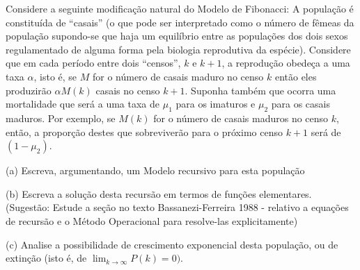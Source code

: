 
    \begin{exercise}
    Considere a seguinte modificação natural do Modelo de Fibonacci: A população é constituída de ``casais'' (o que pode ser interpretado como o número de fêmeas da população supondo-se que haja um equilíbrio entre as populações dos dois sexos regulamentado de alguma forma pela biologia reprodutiva da espécie). Considere que em cada período entre dois ``censos'', \(k\) e \(k + 1\), a reprodução obedeça a uma taxa \(\alpha\), isto é, se \(M\) for o número de casais maduro no censo \(k\) então eles produzirão \(\alpha M(k)\) casais no censo \(k + 1\). Suponha também que ocorra uma mortalidade que será a uma taxa de \(\mu_1\) para os imaturos e \(\mu_2\) para os casais maduros. Por exemplo, se \(M(k)\) for o número de casais maduros no censo \(k\), então, a proporção destes que sobreviverão para o próximo censo \(k + 1\) será de \((1 - \mu_2)\). 
    \begin{description}
    \item (a) Escreva, argumentando, um Modelo recursivo para esta população
    \item (b) Escreva a solução desta recursão em termos de funções elementares. (Sugestão: Estude a seção no texto Bassanezi-Ferreira 1988 - relativo a equações de recursão e o Método Operacional para resolve-las explicitamente)
    \item (c) Analise a possibilidade de crescimento exponencial desta população, ou de extinção (isto é, de \(\displaystyle\lim_{k \to \infty} P(k) = 0)\).
    \end{description}
    \end{exercise}

